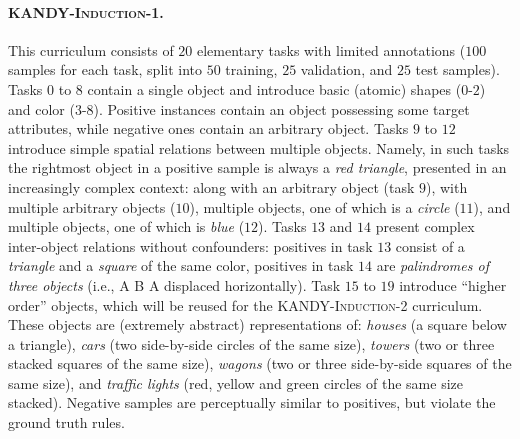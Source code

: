\paragraph{\textsc{KANDY-Induction-1}.} This curriculum consists of $20$ elementary tasks with limited annotations ($100$ samples for each task, split into $50$ training, $25$ validation, and $25$ test samples).
Tasks $0$ to $8$ contain a single object and introduce basic (atomic) shapes ($0$-$2$) and color ($3$-$8$). %
Positive instances contain an object possessing some target attributes, while negative ones contain an arbitrary object.
%
Tasks $9$ to $12$ introduce simple spatial relations between multiple objects. Namely, in such tasks the rightmost object in a positive sample is always a {\it red triangle}, presented in an increasingly complex context: along with an arbitrary object (task $9$), with multiple arbitrary objects ($10$), multiple objects, one of which is a {\it circle} ($11$), and multiple objects, one of which is {\it blue} ($12$). 
%
Tasks $13$ and $14$ present complex inter-object relations without confounders: positives in task $13$ consist of a {\it triangle} and a {\it square} of the same color, positives in task $14$ are {\it palindromes of three objects} (i.e., A B A displaced horizontally).
%
Task $15$ to $19$ introduce ``higher order'' objects, which will be reused for the \textsc{KANDY-Induction-2} curriculum. These objects are (extremely abstract) representations of: {\it houses} (a square below a triangle), {\it cars} (two side-by-side circles of the same size), {\it towers} (two or three stacked squares of the same size), {\it wagons} (two or three side-by-side squares of the same size), and {\it traffic lights} (red, yellow and green circles of the same size stacked). Negative samples are perceptually similar to positives, but violate the ground truth rules. %



